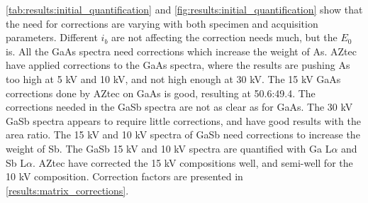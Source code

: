 \cref{tab:results:initial_quantification} and \cref{fig:results:initial_quantification} show that the need for corrections are varying with both specimen and acquisition parameters.
Different $i_b$ are not affecting the correction needs much, but the $E_0$ is.
All the GaAs spectra need corrections which increase the weight of As.
AZtec have applied corrections to the GaAs spectra, where the results are pushing As too high at 5 kV and 10 kV, and not high enough at 30 kV.
The 15 kV GaAs corrections done by AZtec on GaAs is good, resulting at 50.6:49.4.
The corrections needed in the GaSb spectra are not as clear as for GaAs.
The 30 kV GaSb spectra appears to require little corrections, and have good results with the area ratio.
The 15 kV and 10 kV spectra of GaSb need corrections to increase the weight of Sb.
The GaSb 15 kV and 10 kV spectra are quantified with Ga L$\alpha$ and Sb L$\alpha$.
AZtec have corrected the 15 kV compositions well, and semi-well for the 10 kV composition.
Correction factors are presented in \cref{results:matrix_corrections}.







